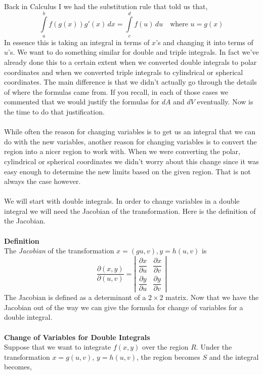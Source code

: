 \documentclass[10pt,reqno]{book}
\theoremstyle{definition}
\begin{document}
	Back in Calculus I we had the substitution rule that told us that,
	\[ \int\limits_a^b f(g(x))g'(x)\,dx = \int\limits_c^d f(u)\,du \quad \text{where } u = g(x) \]
	In essence this is taking an integral in terms of $ x $'s and changing it into terms of $ u $'s. We want to do something similar for double and triple integrals. In fact we've already done this to a certain extent when we converted double integrals to polar coordinates and when we converted triple integrals to cylindrical or spherical coordinates. The main difference is that we didn't actually go through the details of where the formulas came from. If you recall, in each of those cases we commented that we would justify the formulas for $ dA $ and $ dV $ eventually. Now is the time to do that justification.\\ \\
	While often the reason for changing variables is to get us an integral that we can do with the new variables, another reason for changing variables is to convert the region into a nicer region to work with. When we were converting the polar, cylindrical or spherical coordinates we didn't worry about this change since it was easy enough to determine the new limits based on the given region. That is not always the case however. \\ \\
	We will start with double integrals. In order to change variables in a double integral we will need the Jacobian of the transformation. Here is the definition of the Jacobian.\\ \\
	\textbf{Definition}\\
	The \textit{Jacobian} of the transformation $ x = (gu,v), y = h(u,v) $ is 
	\[ \frac{\partial (x,y)}{\partial (u,v)} = 
			\left|
				\begin{array}{cc}
					\dfrac{\partial x}{\partial u} & \dfrac{\partial x}{\partial v}\\[8pt]
					\dfrac{\partial y}{\partial u} & \dfrac{\partial y}{\partial v}
				\end{array}
			\right|
	 \]
	 The Jacobian is defined as a determinant of a $ 2 \times 2 $ matrix. Now that we have the Jacobian out of the way we can give the formula for change of variables for a double integral.\\ \\
	 \textbf{Change of Variables for Double Integrals}\\
	 Suppose that we want to integrate $ f(x,y) $ over the region $ R $. Under the transformation $ x = g(u,v) $, $ y = h(u,v) $, the region becomes $ S $ and the integral becomes,
\end{document}
